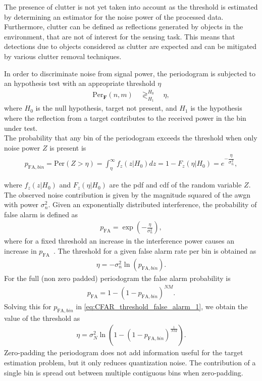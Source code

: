 				The presence of clutter is not yet taken into account as the threshold is estimated by determining an estimator for the noise power of the processed data. 
				Furthermore, clutter can be defined as reflections generated by objects in the environment, that are not of interest for the sensing task. 
				This means that detections due to objects considered as clutter are expected and can be mitigated by various clutter removal techniques.
				
				In order to discriminate noise from signal power, the periodogram is subjected to an hypothesis test with an appropriate threshold $\eta$
				\begin{align}
					\text{Per}_{\mathbf F}(n,m) \quad\mathop{\gtrless}_{H_1}^{H_0}  \quad \eta,
				\end{align}
				where $H_0$ is the null hypothesis, target not present, and $H_1$ is the hypothesis where the reflection from a target contributes to the received power in the bin under test.\\
				The probability that any bin of the periodogram exceeds the threshold when only noise power $Z$ is present is
				\begin{align}
					p_{\text{FA},bin} = \text{Per}(Z > \eta) = \int_\eta^{\infty} f_z(z|H_0)dz = 1 - F_z(\eta | H_0) = e^{-\dfrac{\eta}{\sigma_n^2}},
				\end{align}
				 
				where $f_z(z|H_0)$ and $F_z(\eta | H_0)$ are the \gls{pdf} and \gls{cdf} of the random variable $Z$. 
				The observed noise contribution is given by the magnitude squared of the \gls{awgn} with power $\sigma_n^2$.
				Given an exponentially distributed interference, the probability of false alarm is defined as
				\begin{align}
					p_\text{FA} = \exp \left( -\frac{\eta}{\sigma_n^2}\right),
				\end{align}
			where for a fixed threshold an increase in the interference power causes an increase in $p_\text{FA}$~\cite{Richards_Scheer_Holm_2010}.
				The threshold for a given false alarm rate per bin is obtained as
				\begin{align}
					\eta = -\sigma_n^2 \ln(p_{\text{FA},bin}) .
					\label{eq:CFAR_threshold_false_alarm_1}
				\end{align} 
				For the full (non zero padded) periodogram the false alarm probability is
				\begin{align}
					p_\text{FA} = 1 - (1 - p_{\text{FA},bin})^{NM}.
				\end{align}
				Solving this for $p_{\text{FA},bin}$ in \eqref{eq:CFAR_threshold_false_alarm_1}, we obtain the value of the threshold as 
				\begin{align}
					\eta = \sigma_N^2 \ln{(1 - (1 - p_{\text{FA},bin})^{\frac{1}{NM}})}.
				\end{align}
				Zero-padding the periodogram does not add information useful for the target estimation problem, but it only reduces quantization noise. The contribution of a single bin is spread out between multiple contiguous bins when zero-padding.
				
